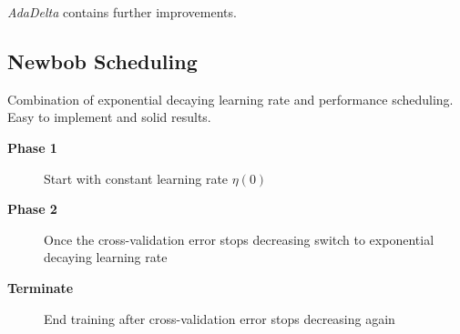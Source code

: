 \emph{AdaDelta} contains further improvements.

\subsection{Newbob Scheduling}
Combination of exponential decaying learning rate and performance scheduling. Easy to implement and solid results.
\begin{description}
\item[\textbf{Phase 1}] Start with constant learning rate $\eta(0)$
\item[\textbf{Phase 2}] Once the cross-validation error stops decreasing switch to exponential decaying learning rate
\item[\textbf{Terminate}] End training after cross-validation error stops decreasing again
\end{description}
